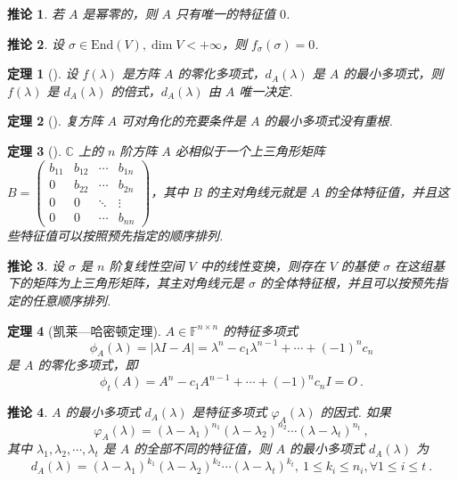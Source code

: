 \documentclass[zihao=-4,UTF8,linespread=1.8,nothm]{aytony_base}
\newtheorem{theorem}{\indent 定理}[subsection]
\newtheorem*{corollary}{\indent 推论}
\begin{document}
\begin{corollary}
    若 $A$ 是幂零的，则 $A$ 只有唯一的特征值 $0$.
\end{corollary}

\begin{corollary}
    设 $\sigma \in \mathrm{End}(V), \dim V < +\infty$，则 $f_{\sigma}(\sigma) = 0$.
\end{corollary}

\begin{theorem}[]
    设 $f(\lambda)$ 是方阵 $A$ 的零化多项式，$d_A(\lambda)$ 是 $A$ 的最小多项式，则 $f(\lambda)$ 是 $d_A(\lambda)$ 的倍式，$d_A(\lambda)$ 由 $A$ 唯一决定.
\end{theorem}

\begin{theorem}[]
    复方阵 $A$ 可对角化的充要条件是 $A$ 的最小多项式没有重根.
\end{theorem}

\begin{theorem}[]
    $\mathbb{C}$ 上的 $n$ 阶方阵 $A$ 必相似于一个上三角形矩阵 $B = \left(
        \begin{matrix}
                b_{11} & b_{12} & \cdots & b_{1n} \\
                0      & b_{22} & \cdots & b_{2n} \\
                0      & 0      & \ddots & \vdots \\
                0      & 0      & \cdots & b_{nn}
            \end{matrix}
        \right)$，其中 $B$ 的主对角线元就是 $A$ 的全体特征值，并且这些特征值可以按照预先指定的顺序排列.
\end{theorem}

\begin{corollary}
    设 $\sigma$ 是 $n$ 阶复线性空间 $V$ 中的线性变换，则存在 $V$ 的基使 $\sigma$ 在这组基下的矩阵为上三角形矩阵，其主对角线元是 $\sigma$ 的全体特征根，并且可以按预先指定的任意顺序排列.
\end{corollary}

\begin{theorem}[凯莱---哈密顿定理]
    $A \in \mathbb{F}^{n \times n}$ 的特征多项式 $$
        \phi_A(\lambda) = |\lambda I - A| = \lambda^n - c_1\lambda^{n-1} + \cdots + (-1)^nc_n
    $$ 是 $A$ 的零化多项式，即 $$
        \phi_t(A) = A^n - c_1A^{n-1} + \cdots + (-1)^nc_nI = O\ .
    $$
\end{theorem}

\begin{corollary}
    $A$ 的最小多项式 $d_A(\lambda)$ 是特征多项式 $\varphi_A(\lambda)$ 的因式. 如果 $$
        \varphi_A(\lambda) = (\lambda - \lambda_1)^{n_1}(\lambda - \lambda_2)^{n_2}\cdots(\lambda - \lambda_t)^{n_t}\ ,
    $$ 其中 ${\lambda}_1, {\lambda}_2, \cdots, {\lambda}_{t}$ 是 $A$ 的全部不同的特征值，则 $A$ 的最小多项式 $d_A(\lambda)$ 为 $$
        d_A(\lambda) = (\lambda - \lambda_1)^{k_1}(\lambda - \lambda_2)^{k_2} \cdots (\lambda - \lambda_t)^{k_t},\ 1 \leqslant k_i \leqslant n_i, \forall 1 \leqslant i \leqslant t\ .
    $$
\end{corollary}
\end{document}
